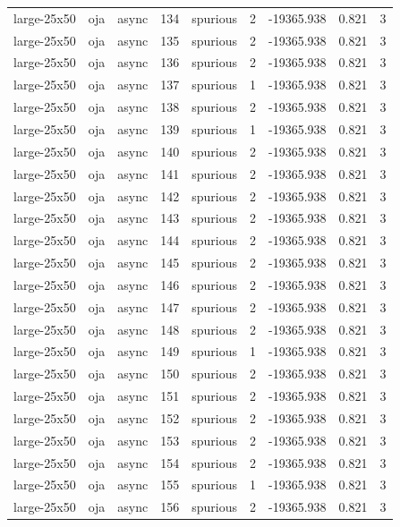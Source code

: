 \begin{tabular}{lllrlrrrr}
large-25x50 & oja & async & 134 & spurious & 2 & -19365.938 & 0.821 & 3 \\
large-25x50 & oja & async & 135 & spurious & 2 & -19365.938 & 0.821 & 3 \\
large-25x50 & oja & async & 136 & spurious & 2 & -19365.938 & 0.821 & 3 \\
large-25x50 & oja & async & 137 & spurious & 1 & -19365.938 & 0.821 & 3 \\
large-25x50 & oja & async & 138 & spurious & 2 & -19365.938 & 0.821 & 3 \\
large-25x50 & oja & async & 139 & spurious & 1 & -19365.938 & 0.821 & 3 \\
large-25x50 & oja & async & 140 & spurious & 2 & -19365.938 & 0.821 & 3 \\
large-25x50 & oja & async & 141 & spurious & 2 & -19365.938 & 0.821 & 3 \\
large-25x50 & oja & async & 142 & spurious & 2 & -19365.938 & 0.821 & 3 \\
large-25x50 & oja & async & 143 & spurious & 2 & -19365.938 & 0.821 & 3 \\
large-25x50 & oja & async & 144 & spurious & 2 & -19365.938 & 0.821 & 3 \\
large-25x50 & oja & async & 145 & spurious & 2 & -19365.938 & 0.821 & 3 \\
large-25x50 & oja & async & 146 & spurious & 2 & -19365.938 & 0.821 & 3 \\
large-25x50 & oja & async & 147 & spurious & 2 & -19365.938 & 0.821 & 3 \\
large-25x50 & oja & async & 148 & spurious & 2 & -19365.938 & 0.821 & 3 \\
large-25x50 & oja & async & 149 & spurious & 1 & -19365.938 & 0.821 & 3 \\
large-25x50 & oja & async & 150 & spurious & 2 & -19365.938 & 0.821 & 3 \\
large-25x50 & oja & async & 151 & spurious & 2 & -19365.938 & 0.821 & 3 \\
large-25x50 & oja & async & 152 & spurious & 2 & -19365.938 & 0.821 & 3 \\
large-25x50 & oja & async & 153 & spurious & 2 & -19365.938 & 0.821 & 3 \\
large-25x50 & oja & async & 154 & spurious & 2 & -19365.938 & 0.821 & 3 \\
large-25x50 & oja & async & 155 & spurious & 1 & -19365.938 & 0.821 & 3 \\
large-25x50 & oja & async & 156 & spurious & 2 & -19365.938 & 0.821 & 3 \\

\end{tabular}
